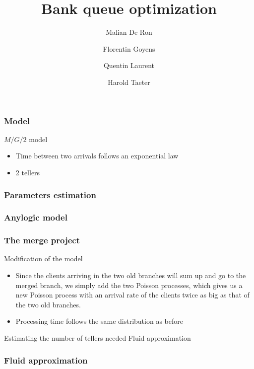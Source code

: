 \documentclass[10pt]{beamer}
\title{Bank queue optimization}
\author{
  Malian De Ron
  \and
  Florentin Goyens
  \and
  Quentin Laurent
  \and
  Harold Taeter
}
\begin{document}
\begin{frame}
  \maketitle
\end{frame}

\begin{frame}
  \frametitle{Model}
  \begin{block}{$M/G/2$ model}
  \begin{itemize}
    \item Time between two arrivals follows an exponential law
    \item 2 tellers
    \end{itemize}
  \end{block}
\end{frame}


\begin{frame}
  \frametitle{Parameters estimation}
 
  
\end{frame}

\begin{frame}
  \frametitle{Anylogic model}
  
\end{frame}

\begin{frame}
  \frametitle{The merge project}
  \begin{block}{Modification of the model}
  \begin{itemize}
  \item  Since the clients arriving in the two old branches will sum up and go to the merged branch, we simply add the two Poisson processes, which gives us a new Poisson process with an arrival rate of the clients twice as big as that of the two old branches.
  \item Processing time follows the same distribution as before
  \end{itemize}
  \end{block}
  
  \begin{block}{Estimating the number of tellers needed}
  Fluid approximation
  \end{block}
\end{frame}

\begin{frame}
\frametitle{Fluid approximation}


\end{frame}
\end{document}
